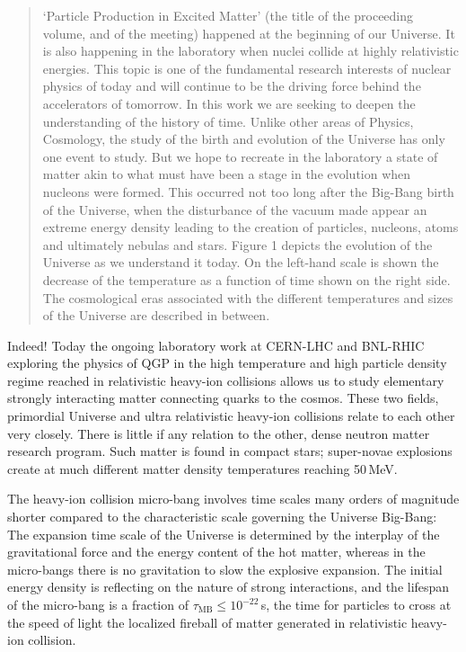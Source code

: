 \begin{quote}
`Particle Production in Excited Matter' (the title of the proceeding volume, and of the meeting) happened at the beginning of our Universe. It is also happening in the laboratory when nuclei collide at highly relativistic energies. This topic is one of the fundamental research interests of nuclear physics of today and will continue to be the driving force behind the accelerators of tomorrow. In this work we are seeking to deepen the understanding of the history of time. Unlike other areas of Physics, Cosmology, the study of the birth and evolution of the Universe has only one event to study. But we hope to recreate in the laboratory a state of matter akin to what must have been a stage in the evolution when nucleons were formed. This occurred not too long after the Big-Bang birth of the Universe, when the disturbance of the vacuum made appear an extreme energy density leading to the creation of particles, nucleons, atoms and ultimately nebulas and stars. Figure 1 depicts the evolution of the Universe as we understand it today. On the left-hand scale is shown the decrease of the temperature as a function of time shown on the right side. The cosmological eras associated with the different temperatures and sizes of the Universe are described in between.
\end{quote}

Indeed! Today the ongoing laboratory work at CERN-LHC and BNL-RHIC exploring the physics of QGP in the high temperature and high particle density regime reached in relativistic heavy-ion collisions allows us to study elementary strongly interacting matter connecting quarks to the cosmos. These two fields, primordial Universe and ultra relativistic heavy-ion collisions relate to each other very closely. There is little if any relation to the other, dense neutron matter research program. Such matter is found in compact stars; super-novae explosions create at much different matter density temperatures reaching 50\,MeV. 

The heavy-ion collision micro-bang involves time scales many orders of magnitude shorter compared to the characteristic scale governing the Universe Big-Bang: The expansion time scale of the Universe is determined by the interplay of the gravitational force and the energy content of the hot matter, whereas in the micro-bangs there is no gravitation to slow the explosive expansion. The initial energy density is reflecting on the nature of strong interactions, and the lifespan of the micro-bang is a fraction of $\tau_\mathrm{MB}\le 10^{-22}$\,s, the time for particles to cross at the speed of light the localized fireball of matter generated in relativistic heavy-ion collision. 

